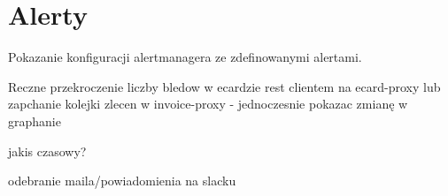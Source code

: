 \documentclass[12pt,a4paper,notitlepage,onecolumn]{article}
\begin{document}
	\section{Alerty}
     Pokazanie konfiguracji alertmanagera ze zdefinowanymi alertami.
     
     Reczne przekroczenie liczby bledow w ecardzie  rest clientem na ecard-proxy lub zapchanie kolejki zlecen w invoice-proxy -
      jednoczesnie pokazac zmianę w graphanie
     
     jakis czasowy?
     
     odebranie maila/powiadomienia na slacku
     
\end{document}
